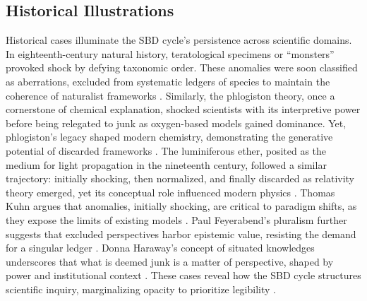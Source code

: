\documentclass[12pt]{article}
\begin{document}
\subsection{Historical Illustrations}
Historical cases illuminate the SBD cycle’s persistence across scientific domains. In eighteenth-century natural history, teratological specimens or ``monsters'' provoked shock by defying taxonomic order. These anomalies were soon classified as aberrations, excluded from systematic ledgers of species to maintain the coherence of naturalist frameworks \citep{daston1998}. Similarly, the phlogiston theory, once a cornerstone of chemical explanation, shocked scientists with its interpretive power before being relegated to junk as oxygen-based models gained dominance. Yet, phlogiston’s legacy shaped modern chemistry, demonstrating the generative potential of discarded frameworks \citep{shapin1985}. The luminiferous ether, posited as the medium for light propagation in the nineteenth century, followed a similar trajectory: initially shocking, then normalized, and finally discarded as relativity theory emerged, yet its conceptual role influenced modern physics \citep{whittaker1951}. Thomas Kuhn argues that anomalies, initially shocking, are critical to paradigm shifts, as they expose the limits of existing models \citep{kuhn1962}. Paul Feyerabend’s pluralism further suggests that excluded perspectives harbor epistemic value, resisting the demand for a singular ledger \citep{feyerabend1975}. Donna Haraway’s concept of situated knowledges underscores that what is deemed junk is a matter of perspective, shaped by power and institutional context \citep{haraway1988}. These cases reveal how the SBD cycle structures scientific inquiry, marginalizing opacity to prioritize legibility \citep{bowker2005}.
\end{document}
